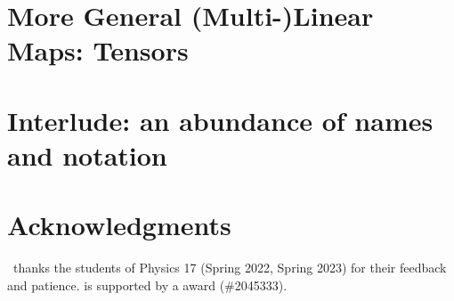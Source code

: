 \documentclass[12pt]{article}
\begin{document}
\section{More General (Multi-)Linear Maps: Tensors}

\section{Interlude: an abundance of names and notation}

\section*{Acknowledgments}

\ thanks the students of Physics 17 (Spring 2022, Spring 2023) for their feedback and patience.
%
 is supported by a  award (\#2045333).



% 
\end{document}
